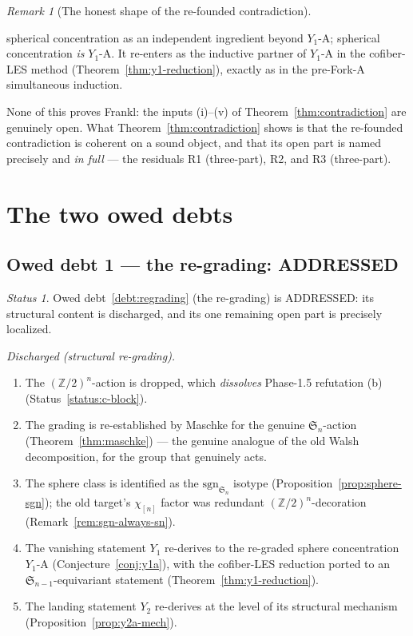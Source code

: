\documentclass[11pt,oneside]{amsart}
\theoremstyle{plain}
\theoremstyle{definition}
\theoremstyle{remark}
\newtheorem{remark}[theorem]{Remark}
\theoremstyle{honeststyle}
\newtheorem{status}[theorem]{Status}
\newcommand{\sgn}{\mathrm{sgn}}
\newcommand{\Sym}{\mathfrak{S}}
\newcommand{\Z}{\mathbb{Z}}
\newcommand{\walsh}[1]{\chi_{#1}}
\begin{document}
\begin{remark}[The honest shape of the re-founded contradiction]
\begin{itemize}[leftmargin=1.5em]
  spherical concentration as an independent ingredient beyond $Y_1$-A;
  spherical concentration \emph{is} $Y_1$-A. It re-enters as the
  inductive partner of $Y_1$-A in the cofiber-LES method
  (Theorem~\ref{thm:y1-reduction}), exactly as in the pre-Fork-A
  simultaneous induction.
\end{itemize}
None of this proves Frankl: the inputs (i)--(v) of
Theorem~\ref{thm:contradiction} are genuinely open. What
Theorem~\ref{thm:contradiction} shows is that the re-founded
contradiction is coherent on a sound object, and that its open part is
named precisely and \emph{in full} --- the residuals R1 (three-part),
R2, and R3 (three-part).
\end{remark}

\section{The two owed debts}
\label{sec:debts}

\subsection{Owed debt 1 --- the re-grading: ADDRESSED}
\label{ssec:debt1}

\begin{status}
\label{status:debt1}
Owed debt~\ref{debt:regrading} (the re-grading) is \textsf{ADDRESSED}:
its structural content is discharged, and its one remaining open part
is precisely localized.
\end{status}

\noindent\emph{Discharged (structural re-grading).}
\begin{enumerate}[label=\textup{(\arabic*)},leftmargin=2.2em]
\item The $(\Z/2)^n$-action is dropped, which \emph{dissolves}
  Phase-1.5 refutation (b) (Status~\ref{status:c-block}).
\item The grading is re-established by Maschke for the genuine
  $\Sym_n$-action (Theorem~\ref{thm:maschke}) --- the genuine analogue
  of the old Walsh decomposition, for the group that genuinely acts.
\item The sphere class is identified as the $\sgn_{\Sym_n}$ isotype
  (Proposition~\ref{prop:sphere-sgn}); the old target's $\walsh{[n]}$
  factor was redundant $(\Z/2)^n$-decoration
  (Remark~\ref{rem:sgn-always-sn}).
\item The vanishing statement $Y_1$ re-derives to the re-graded
  sphere concentration $Y_1$-A (Conjecture~\ref{conj:y1a}), with the
  cofiber-LES reduction ported to an $\Sym_{n-1}$-equivariant
  statement (Theorem~\ref{thm:y1-reduction}).
\item The landing statement $Y_2$ re-derives at the level of its
  structural mechanism (Proposition~\ref{prop:y2a-mech}).
\end{enumerate}
\end{document}
